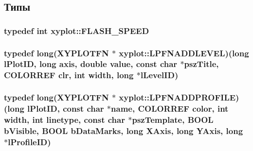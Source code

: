 \subsection{Типы}
\hypertarget{namespacexyplot_aef2fa49b82f49b1152511044149c60bb}{
\subsubsection[{F\-L\-A\-S\-H\-\_\-\-S\-P\-E\-E\-D}]{\setlength{\rightskip}{0pt plus 5cm}typedef int {\bf xyplot\-::\-F\-L\-A\-S\-H\-\_\-\-S\-P\-E\-E\-D}}}\label{namespacexyplot_aef2fa49b82f49b1152511044149c60bb}
\hypertarget{namespacexyplot_acfe1c4a6bf88e4c101cae03f31602993}{
\subsubsection[{L\-P\-F\-N\-A\-D\-D\-L\-E\-V\-E\-L}]{\setlength{\rightskip}{0pt plus 5cm}typedef {\bf long}({\bf X\-Y\-P\-L\-O\-T\-F\-N} $\ast$ xyplot\-::\-L\-P\-F\-N\-A\-D\-D\-L\-E\-V\-E\-L)({\bf long} l\-Plot\-I\-D, {\bf long} axis, double value, const char $\ast$psz\-Title, C\-O\-L\-O\-R\-R\-E\-F clr, int width, {\bf long} $\ast$l\-Level\-I\-D)}}\label{namespacexyplot_acfe1c4a6bf88e4c101cae03f31602993}
\hypertarget{namespacexyplot_ab78664aa6b50a88a556408cdcb0fedde}{
\subsubsection[{L\-P\-F\-N\-A\-D\-D\-P\-R\-O\-F\-I\-L\-E}]{\setlength{\rightskip}{0pt plus 5cm}typedef {\bf long}({\bf X\-Y\-P\-L\-O\-T\-F\-N} $\ast$ xyplot\-::\-L\-P\-F\-N\-A\-D\-D\-P\-R\-O\-F\-I\-L\-E)({\bf long} l\-Plot\-I\-D, const char $\ast$name, C\-O\-L\-O\-R\-R\-E\-F color, int width, int linetype, const char $\ast$psz\-Template, B\-O\-O\-L b\-Visible, B\-O\-O\-L b\-Data\-Marks, {\bf long} X\-Axis, {\bf long} Y\-Axis, {\bf long} $\ast${\bf l\-Profile\-I\-D})}}\label{namespacexyplot_ab78664aa6b50a88a556408cdcb0fedde}
